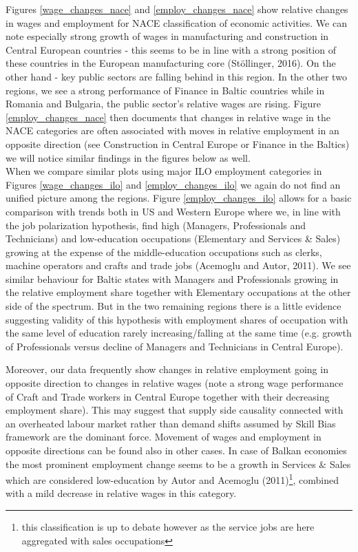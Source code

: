 \documentclass{article}
\begin{document}
Figures \ref{wage_changes_nace} and \ref{employ_changes_nace} show relative changes in wages and employment for NACE classification of economic activities. We can note especially strong growth of wages in manufacturing and construction in Central European countries - this seems to be in line with a strong position of these countries in the European manufacturing core (Stöllinger, 2016). On the other hand - key public sectors are falling behind in this region. In the other two regions, we see a strong performance of Finance in Baltic countries while in Romania and Bulgaria, the public sector's relative wages are rising. Figure \ref{employ_changes_nace} then documents that changes in relative wage in the NACE categories are often associated with moves in relative employment in an opposite direction (see Construction in Central Europe or Finance in the Baltics) we will notice similar findings in the figures below as well.\\
When we compare similar plots using major ILO employment categories in Figures \ref{wage_changes_ilo} and \ref{employ_changes_ilo} we again do not find an unified picture among the regions. Figure \ref{employ_changes_ilo} allows for a basic comparison with trends both in US and Western Europe where we, in line with the job polarization hypothesis, find high (Managers, Professionals and Technicians) and low-education occupations (Elementary and Services \& Sales) growing at the expense of the middle-education occupations such as clerks, machine operators and crafts and trade jobs (Acemoglu and Autor, 2011). We see similar behaviour for Baltic states with Managers and Professionals growing in the relative employment share together with Elementary occupations at the other side of the spectrum. But in the two remaining regions there is a little evidence suggesting validity of this hypothesis with employment shares of occupation with the same level of education rarely increasing/falling at the same time (e.g. growth of Professionals versus decline of Managers and Technicians in Central Europe).

Moreover, our data frequently show changes in relative employment going in opposite direction to changes in relative wages (note a strong wage performance of Craft and Trade workers in Central Europe together with their decreasing employment share). This may suggest that supply side causality connected with an overheated labour market rather than demand shifts assumed by Skill Bias framework are the dominant force. Movement of wages and employment in opposite directions can be found also in other cases.
In case of Balkan economies the most prominent employment change seems to be a growth in Services $\&$ Sales which are considered low-education by Autor and Acemoglu (2011)\footnote{this classification is up to debate however as the service jobs are here aggregated with sales occupations}, combined with a mild decrease in relative wages in this category.
\end{document}
